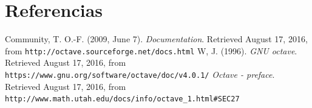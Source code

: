 \documentclass{IEEEtran}
\begin{document}
\section{Referencias}

\begin{thebibliography}{99}

 Community, T. O.-F. (2009, June 7). \emph{Documentation}. Retrieved August 17, 2016, from \texttt{http://octave.sourceforge.net/docs.html}
 W, J. (1996). \emph{GNU octave}. Retrieved August 17, 2016, from \texttt{https://www.gnu.org/software/octave/doc/v4.0.1/}
 \emph{Octave - preface}. Retrieved August 17, 2016, from \texttt{http://www.math.utah.edu/docs/info/octave\_1.html\#SEC27}
\end{thebibliography}
\end{document}
